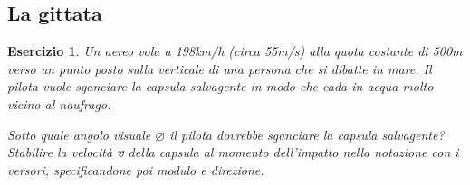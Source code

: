 \documentclass{article}
\newtheorem{es}{Esercizio}[section]
\begin{document}
\subsection{La gittata}
\label{sec:gittata}
\begin{es}
  Un aereo vola a 198km/h (circa 55m/s) alla quota costante di 500m verso un punto posto sulla verticale di una persona che si dibatte in mare. Il pilota vuole sganciare la capsula salvagente in modo che cada in acqua molto vicino al naufrago.
  \begin{tasks}
    \task Sotto quale angolo visuale $\varnothing$ il pilota dovrebbe sganciare la capsula salvagente?
    \task Stabilire la velocità \textbf{v} della capsula al momento dell'impatto nella notazione con i versori, specificandone poi modulo e direzione.
  \end{tasks}
\end{es}
\end{document}
